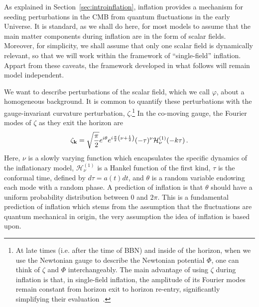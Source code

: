 \documentclass[psfig,11pt]{article}
\def\be{\begin{equation}}
\def\ee{\end{equation}}
\begin{document}
\label{sec:researchinflation}

As explained in Section~\ref{sec:introinflation}, inflation provides a mechanism for seeding perturbations in the CMB from quantum fluctuations in the early Universe. It is standard, as we shall do here, for most models to assume that the main matter components during inflation are in the form of scalar fields.%
Moreover, for simplicity, we shall assume that only one scalar field is dynamically relevant, so that we will work within the framework of ``single-field'' inflation. Appart from these caveats, the framework developed in what follows will remain model independent.

We want to describe perturbations of the scalar field, which we call $\varphi$, about a homogeneous background. It is common to quantify these perturbations with the gauge-invariant curvature perturbation, $\zeta$.\footnote{At late times (i.e. after the time of BBN) and inside of the horizon, when we use the Newtonian gauge to describe the Newtonian potential $\Phi$, one can think of $\zeta$ and $\Phi$ interchangeably. The main advantage of using $\zeta$ during inflation is that, in single-field inflation, the amplitude of its Fourier modes remain constant from horizon exit to horizon re-entry, significantly simplifying their evaluation~\cite{Weinberg2008}.}
 In the co-moving gauge, the Fourier modes of $\zeta$ as they exit the horizon are
\be
	\zeta_{{\bf k}}=\sqrt{\frac{\pi}{2}}e^{i\theta}e^{i\frac{\pi}{2}\left(\nu+\frac{1}{2}\right)}(-\tau)^{\nu}\mathcal{H}^{(1)}_\nu(-k\tau)\, .
\ee
Here, $\nu$ is a slowly varying function which encapsulates the specific dynamics of the inflationary model, $\mathcal{H}^{(1)}_\nu$ is a Hankel function of the first kind, $\tau$ is the conformal time, defined by $d\tau=a(t)dt$, and $\theta$ is a random variable endowing each mode with a random phase. A prediction of inflation is that $\theta$ should have a uniform probability distribution between 0 and $2\pi$. This is a fundamental prediction of inflation which stems from the assumption that the fluctuations are quantum mechanical in origin, the very assumption the idea of inflation is based upon.
\end{document}
